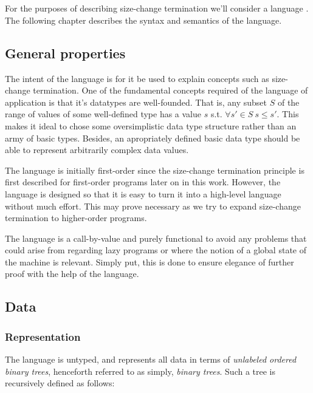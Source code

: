 \chapter{}

For the purposes of describing size-change termination we'll consider a language
. The following chapter describes the syntax and semantics of the
language.

\section{General properties}

The intent of the language is for it be used to explain concepts such as
size-change termination. One of the fundamental concepts required of the
language of application is that it's datatypes are well-founded. That is, any
subset $S$ of the range of values of some well-defined type has a value $s$
s.t. $\forall {s'\in S}\ s\leq s'$. This makes it ideal to chose some
oversimplistic data type structure rather than an army of basic types. Besides,
an apropriately defined basic data type should be able to represent arbitrarily
complex data values.

The language is initially first-order since the size-change termination
principle is first described for first-order programs later on in this work.
However, the language is designed so that it is easy to turn it into a
high-level language without much effort. This may prove necessary as we try to
expand size-change termination to higher-order programs.

The language is a call-by-value and purely functional to avoid any problems
that could arise from regarding lazy programs or where the notion of a global
state of the machine is relevant. Simply put, this is done to ensure elegance
of further proof with the help of the language.



\section{Data}

\subsection{Representation}\label{section:d-data-representation}

The language  is untyped, and represents all data in terms of
\emph{unlabeled ordered binary trees}, henceforth referred to as simply,
\emph{binary trees}. Such a tree is recursively defined as follows:

